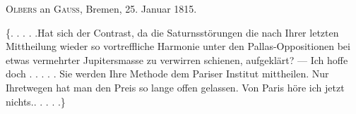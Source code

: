 \par{}\bigskip
\begin{center}
\textsc{Olbers} an \textsc{Gauss}, Bremen, 25. Januar 1815.
\end{center}
\noindent\hspace*{\parindent}\{. . . . .\quad Hat sich der Contrast, da die Saturnsstörungen die nach Ihrer letzten Mittheilung wieder so vortreffliche Harmonie unter den Pallas-Oppositionen bei etwas vermehrter Jupitersmasse zu verwirren schienen, aufgeklärt? — Ich hoffe doch . . . . . Sie werden Ihre Methode dem Pariser Institut mittheilen. Nur Ihretwegen hat man den Preis so lange offen gelassen. Von Paris höre ich jetzt nichts.\quad . . . . .\}
\par
